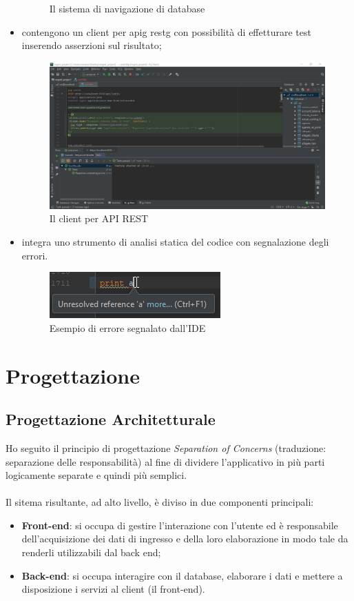 \begin{itemize}
\begin{figure}[H]
			\caption{Il sistema di navigazione di database}
			\label{fig:ide-history}
		\end{figure}
	\item contengono un client per \gls{apig} \gls{restg} con possibilità di effetturare test inserendo asserzioni sul risultato;
		\begin{figure}[H]
			\centering
			\includegraphics[width=0.8\linewidth]{immagini/ide-rest}
			\caption{Il client per API REST}
			\label{fig:ide-history}
		\end{figure}
	\item integra uno strumento di analisi statica del codice con segnalazione degli errori.
		\begin{figure}[H]
			\centering
			\includegraphics[width=0.5\linewidth]{immagini/ide-error}
			\caption{Esempio di errore segnalato dall'IDE}
			\label{fig:ide-error}
		\end{figure}
	\end{itemize}

\section{Progettazione}
	\subsection{Progettazione Architetturale}
Ho seguito il principio di progettazione \emph{Separation of Concerns} (traduzione: separazione delle responsabilità) al fine di dividere l'applicativo in più parti logicamente separate e quindi più semplici. \\ \\
Il sitema risultante, ad alto livello, è diviso in due componenti principali:
	\begin{itemize}
		\item \textbf{Front-end}: si occupa di gestire l'interazione con l'utente ed è responsabile dell'acquisizione dei dati di ingresso e della loro elaborazione in modo tale da renderli utilizzabili dal back end;
		\item \textbf{Back-end}: si occupa interagire con il database, elaborare i dati e mettere a disposizione i servizi al client (il front-end).
	\end{itemize}
	

